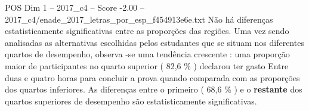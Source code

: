 \begin{textsample}{POS Dim 1 – 2017\_c4 – Score -2.00 – 2017\_c4/enade\_2017\_letras\_por\_esp\_f454913e6e.txt}
Não há diferenças estatisticamente significativas entre as proporções das regiões.
Uma vez sendo analisadas as alternativas escolhidas pelos estudantes que se situam nos diferentes quartos de desempenho, observa -se uma tendência crescente : uma proporção maior de participantes no quarto superior ( 82,6 \% ) declarou ter gasto Entre duas e quatro horas para concluir a prova quando comparada com as proporções dos quartos inferiores.
As diferenças entre o primeiro ( 68,6 \% ) e o \textbf{restante} dos quartos superiores de desempenho são estatisticamente significativas.

\end{textsample}
